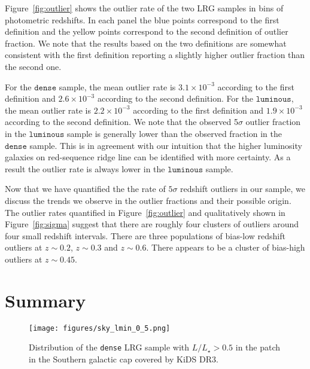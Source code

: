 \documentclass[fleqn,usenatbib]{mnras}
\begin{document}
Figure~\ref{fig:outlier} shows the outlier rate of the two LRG samples in bins of photometric redshifts. In each panel the blue points correspond to the first definition and the yellow points correspond to the second definition of outlier fraction. We note that the results based on the two definitions are somewhat consistent with the first definition reporting a slightly higher outlier fraction than the second one. 

For the $\mathtt{dense}$ sample, the mean outlier rate is $3.1\times 10^{-3}$ according to the first definition and $2.6\times 10^{-3}$ according to the second definition. For the $\mathtt{luminous}$, the mean outlier rate is $2.2\times 10^{-3}$ according to the first definition and $1.9\times 10^{-3}$ according to the second definition.
We note that the observed 5$\sigma$ outlier fraction in the $\mathtt{luminous}$ sample is generally lower than the observed fraction in the $\mathtt{dense}$ sample. This is in agreement with our intuition that the higher luminosity galaxies on red-sequence ridge line can be identified with more certainty. As a result the outlier rate is always lower in the $\mathtt{luminous}$ sample. 

Now that we have quantified the the rate of $5\sigma$ redshift outliers in our sample, we discuss the trends we observe in the outlier fractions and their possible origin. The outlier rates quantified in Figure~\ref{fig:outlier} and qualitatively shown in Figure~\ref{fig:sigma} suggest that there are roughly four clusters of outliers around four small redshift intervals. There are three populations of bias-low redshift outliers at $z\sim 0.2$, $z\sim 0.3$ and $z\sim 0.6$. There appears to be a cluster of bias-high outliers at $z\sim 0.45$.     


\clearpage

\section{Summary}\label{sec:summary}

\begin{figure*}
\texttt{[image: figures/sky\_lmin\_0\_5.png]}
\caption{\label{fig:sky} Distribution of the \texttt{dense} LRG sample with $L/L_{\star}>0.5$ in the patch in the Southern galactic cap covered by KiDS DR3.}
\end{figure*}
\end{document}
